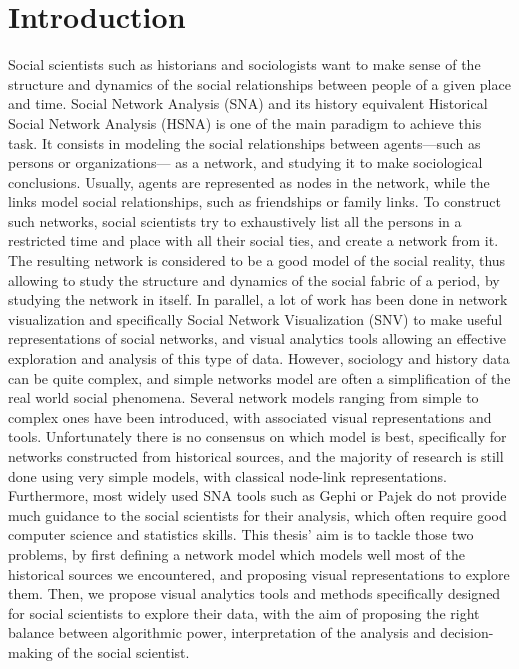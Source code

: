


\chapter{Introduction}

Social scientists such as historians and sociologists want to make sense of the structure and dynamics of the social relationships between people of a given place and time.
Social Network Analysis (SNA) and its history equivalent Historical Social Network Analysis (HSNA) is one of the main paradigm to achieve this task.
It consists in modeling the social relationships between agents---such as persons or organizations--- as a network, and studying it to make sociological conclusions.
Usually, agents are represented as nodes in the network, while the links model social relationships, such as friendships or family links.
To construct such networks, social scientists try to exhaustively list all the persons in a restricted time and place with all their social ties, and create a network from it.
The resulting network is considered to be a good model of the social reality, thus allowing to study the structure and dynamics of the social fabric of a period, by studying the network in itself.
In parallel, a lot of work has been done in network visualization and specifically Social Network Visualization (SNV) to make useful representations of social networks, and visual analytics tools allowing an effective exploration and analysis of this type of data.
However, sociology and history data can be quite complex, and simple networks model are often a simplification of the real world social phenomena.
Several network models ranging from simple to complex ones have been introduced, with associated visual representations and tools.
Unfortunately there is no consensus on which model is best, specifically for networks constructed from historical sources, and the majority of research is still done using very simple models, with classical node-link representations.
Furthermore, most widely used SNA tools such as Gephi or Pajek do not provide much guidance to the social scientists for their analysis, which often require good computer science and statistics skills.
This thesis' aim is to tackle those two problems, by first defining a network model which models well most of the historical sources we encountered, and proposing visual representations to explore them.
Then, we propose visual analytics tools and methods specifically designed for social scientists to explore their data, with the aim of proposing the right balance between algorithmic power, interpretation of the analysis and decision-making of the social scientist.

